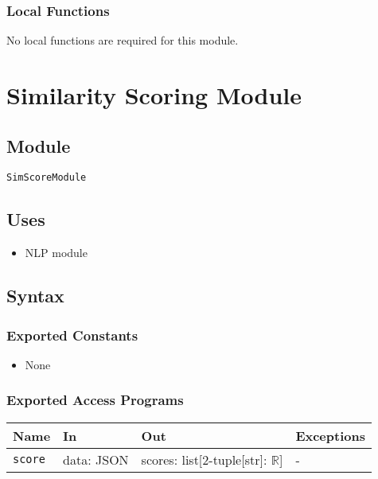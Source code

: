 \documentclass[12pt, titlepage]{article}
\begin{document}
\begin{itemize}
\subsubsection{Local Functions}
No local functions are required for this module.

\section{Similarity Scoring Module} \label{mScoring}

\subsection{Module}

\texttt{SimScoreModule}

\subsection{Uses}

\begin{itemize}
    \item NLP module
\end{itemize}

\subsection{Syntax}

\subsubsection{Exported Constants}

\begin{itemize}
    \item None
\end{itemize}

\subsubsection{Exported Access Programs}

\begin{center}
\begin{tabular}{p{5cm} p{3.5cm} p{3.5cm} p{2cm}}
\hline
\textbf{Name} & \textbf{In} & \textbf{Out} & \textbf{Exceptions} \\
\hline
\texttt{score} & data: JSON & scores: list[2-tuple[str]: $\mathbb{R}$] & - \\ %
\hline
\end{tabular}
\end{center}


\end{itemize}
\end{document}
